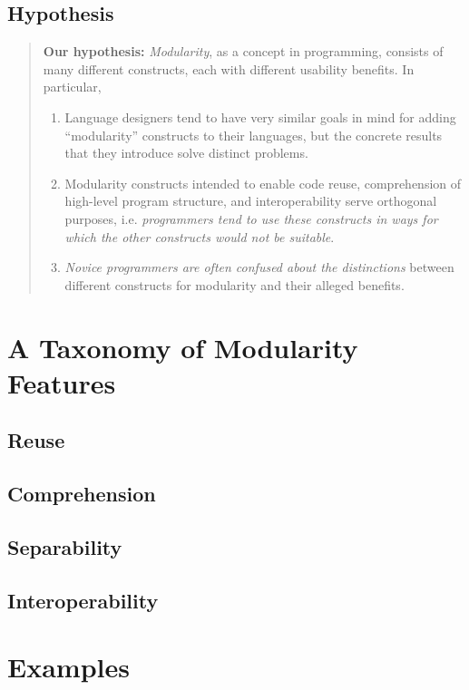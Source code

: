 \documentclass{sigplanconf}
\begin{document}
\subsection{Hypothesis}

\begin{quote}
  {\bf Our hypothesis:}
  {\em Modularity}, as a concept in programming, consists of many different
  constructs, each with different usability benefits. In particular,
  \begin{enumerate}
    \item Language designers tend to have very similar goals in mind for
      adding ``modularity'' constructs to their languages, but the concrete
      results that they introduce solve distinct problems.
    \item Modularity constructs intended to enable code reuse,
      comprehension of high-level program structure, and interoperability
      serve orthogonal purposes, i.e. {\em programmers tend to use these
      constructs in ways for which the other constructs would not be
      suitable}.
    \item {\em Novice programmers are often confused about the
      distinctions} between different constructs for modularity and their
      alleged benefits. 
  \end{enumerate}
\end{quote}

\section{A Taxonomy of Modularity Features}

\subsection{Reuse}

\subsection{Comprehension}

\subsection{Separability}

\subsection{Interoperability}

\section{Examples}
\end{document}

